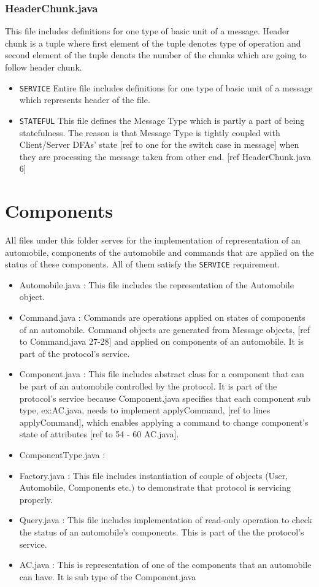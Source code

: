 \documentclass[12pt]{usenixsubmit}
\begin{document}
    \subsubsection{HeaderChunk.java}This file includes definitions for one type of basic unit of a message. Header chunk is a tuple where first element of the tuple denotes type of operation and second element of the tuple denots the number of the chunks which are going to follow header chunk.
    \begin{itemize}
    \item {\tt SERVICE} Entire file includes definitions for one type of basic unit of a message which represents header of the file.
      \item {\tt STATEFUL} This file defines the Message Type  which is partly a part of being statefulness. The reason is that Message Type is tightly coupled with Client/Server DFAs' state [ref to one for the switch case in message] when they are processing the message taken from other end. [ref HeaderChunk.java 6]
     \end{itemize}   

  \section{Components} All files under this folder serves for the implementation of representation of an automobile, components of the automobile and commands that are applied on the status of these components. All of them satisfy the {\tt SERVICE} requirement.
  \begin{itemize}
  \item Automobile.java : This file includes the representation of the Automobile object.
  \item Command.java : Commands are operations applied on states of components of an automobile. Command objects are generated from Message objects, [ref to Command.java 27-28] and applied on components of an automobile. It is part of the protocol's service.
  \item Component.java :  This file includes abstract class for a component that can be part of an automobile controlled by the protocol. It is part of the protocol's service because Component.java specifies that each component sub type, ex:AC.java, needs to implement \textsf{applyCommand}, [ref to lines applyCommand], which enables applying a command to change component's state of attributes [ref to 54 - 60 AC.java]. 
  \item ComponentType.java : 
  \item Factory.java : This file includes instantiation of couple of objects (User, Automobile, Components etc.) to demonstrate that protocol is servicing properly.
  \item Query.java : This file includes implementation of read-only operation to check the status of an automobile's components. This is part of the the protocol's service.
  \item AC.java : This is representation of one of the components that an automobile can have. It is sub type of the Component.java
  \end{itemize}
  
\end{document}
